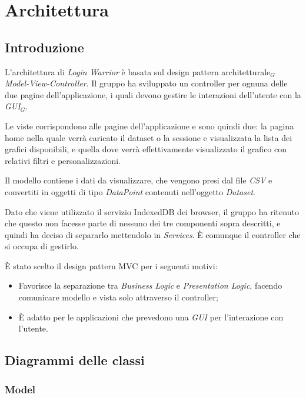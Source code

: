 \chapter{Architettura}
\section{Introduzione}
L'architettura di \textit{Login Warrior} è basata sul design pattern architetturale$_G$ \textit{Model-View-Controller}. Il gruppo ha sviluppato un controller per ognuna delle due pagine dell'applicazione, i quali devono gestire le interazioni dell'utente con la \textit{GUI}$_G$.

 Le viste corrispondono alle pagine dell'applicazione e sono quindi due: la pagina home nella quale verrà caricato il dataset o la sessione e visualizzata la lista dei grafici disponibili, e quella dove verrà effettivamente visualizzato il grafico con relativi filtri e personalizzazioni.

 Il modello contiene i dati da visualizzare, che vengono presi dal file \textit{CSV} e convertiti in oggetti di tipo \textit{DataPoint} contenuti nell'oggetto \textit{Dataset}.

 Dato che viene utilizzato il servizio IndexedDB dei browser, il gruppo ha ritenuto che questo non facesse parte di nessuno dei tre componenti sopra descritti, e quindi ha deciso di separarlo mettendolo in \textit{Services}. È comunque il controller che si occupa di gestirlo.


È stato scelto il design pattern MVC per i seguenti motivi:
\begin{itemize}
  \item Favorisce la separazione tra \textit{Business Logic} e \textit{Presentation Logic}, facendo comunicare modello e vista solo attraverso il controller;
  \item È adatto per le applicazioni che prevedono una \textit{GUI} per l'interazione con l'utente.
\end{itemize}


\section{Diagrammi delle classi}
\subsection{Model}

